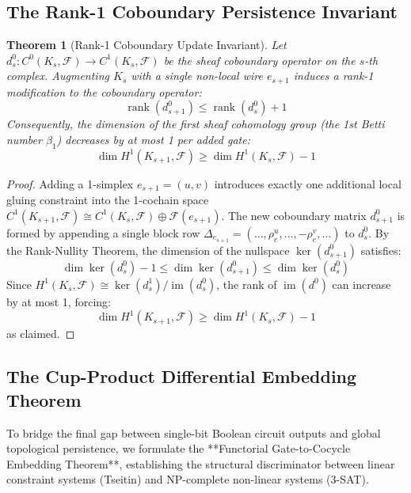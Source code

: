 \documentclass[11pt,a4paper]{article}
\newtheorem{theorem}{Theorem}[section]
\theoremstyle{definition}
\theoremstyle{remark}
\begin{document}
\subsection{The Rank-1 Coboundary Persistence Invariant}

\begin{theorem}[Rank-1 Coboundary Update Invariant]\label{thm:rank1_update}
Let $d^0_s: C^0(K_s, \mathcal{F}) \to C^1(K_s, \mathcal{F})$ be the sheaf coboundary operator on the $s$-th complex. 
Augmenting $K_s$ with a single non-local wire $e_{s+1}$ induces a rank-1 modification to the coboundary operator:
\[
\operatorname{rank}(d^0_{s+1}) \le \operatorname{rank}(d^0_s) + 1
\]
Consequently, the dimension of the first sheaf cohomology group (the 1st Betti number $\beta_1$) decreases by at most 1 per added gate:
\[
\dim H^1(K_{s+1}, \mathcal{F}) \ge \dim H^1(K_s, \mathcal{F}) - 1
\]
\end{theorem}

\begin{proof}
Adding a 1-simplex $e_{s+1} = (u, v)$ introduces exactly one additional local gluing constraint into the 1-cochain space $C^1(K_{s+1}, \mathcal{F}) \cong C^1(K_s, \mathcal{F}) \oplus \mathcal{F}(e_{s+1})$. 
The new coboundary matrix $d^0_{s+1}$ is formed by appending a single block row $\Delta_{e_{s+1}} = (\dots, \rho_e^u, \dots, -\rho_e^v, \dots)$ to $d^0_s$. 
By the Rank-Nullity Theorem, the dimension of the nullspace $\ker(d^0_{s+1})$ satisfies:
\[
\dim \ker(d^0_s) - 1 \le \dim \ker(d^0_{s+1}) \le \dim \ker(d^0_s)
\]
Since $H^1(K_s, \mathcal{F}) \cong \ker(d^1_s) / \operatorname{im}(d^0_s)$, the rank of $\operatorname{im}(d^0)$ can increase by at most 1, forcing:
\[
\dim H^1(K_{s+1}, \mathcal{F}) \ge \dim H^1(K_s, \mathcal{F}) - 1
\]
as claimed.
\end{proof}

\subsection{The Cup-Product Differential Embedding Theorem}

To bridge the final gap between single-bit Boolean circuit outputs and global topological persistence, we formulate the **Functorial Gate-to-Cocycle Embedding Theorem**, establishing the structural discriminator between linear constraint systems (Tseitin) and NP-complete non-linear systems (3-SAT).
\end{document}
